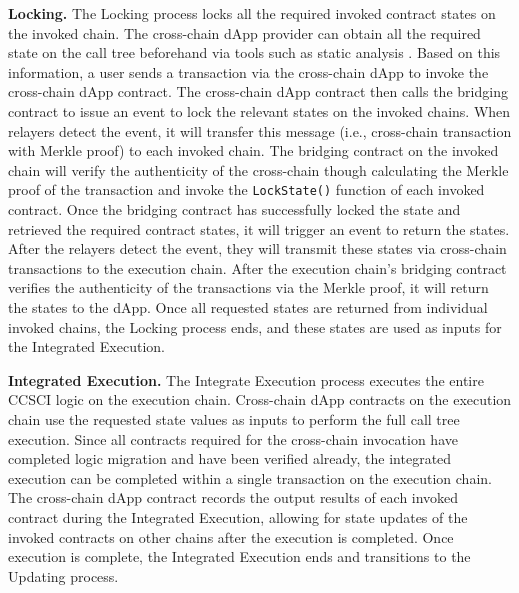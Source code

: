 \vspace{3pt}
\noindent
\textbf{Locking. }
The Locking process locks all the required invoked contract states on the invoked chain.
The cross-chain dApp provider can obtain all the required state on the call tree beforehand via tools such as static analysis \cite{feist2019slither}.
Based on this information, a user sends a transaction via the cross-chain dApp to invoke the cross-chain dApp contract. 
The cross-chain dApp contract then calls the bridging contract to issue an event to lock the relevant states on the invoked chains.
When relayers detect the event, it will transfer this message (i.e., cross-chain transaction with Merkle proof) to each invoked chain. 
The bridging contract on the invoked chain will verify the authenticity of the cross-chain though calculating the Merkle proof of the transaction and invoke the \texttt{LockState()} function of each invoked contract. 
Once the bridging contract has successfully locked the state and retrieved the required contract states, it will trigger an event to return the states. 
After the relayers detect the event, they will transmit these states via cross-chain transactions to the execution chain. 
After the execution chain's bridging contract verifies the authenticity of the transactions via the Merkle proof, it will return the states to the dApp.
Once all requested states are returned from individual invoked chains, the Locking process ends, and these states are used as inputs for the Integrated Execution.

\vspace{3pt}
\noindent
\textbf{Integrated Execution. }
The Integrate Execution process executes the entire CCSCI logic on the execution chain.
Cross-chain dApp contracts on the execution chain use the requested state values as inputs to perform the full call tree execution. 
Since all contracts required for the cross-chain invocation have completed logic migration and have been verified already, the integrated execution can be completed within a single transaction on the execution chain. 
The cross-chain dApp contract records the output results of each invoked contract during the Integrated Execution, allowing for state updates of the invoked contracts on other chains after the execution is completed. 
Once execution is complete, the Integrated Execution ends and transitions to the Updating process.

